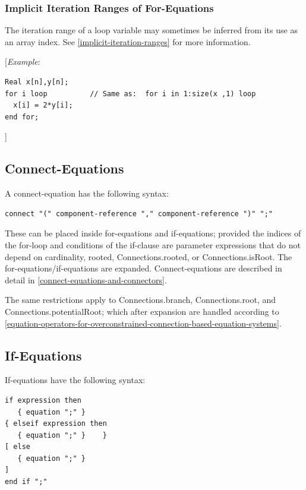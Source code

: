 \documentclass[10pt,a4paper]{report}
\def\doublelabel#1{\label{#1}}
\begin{document}
\subsubsection{Implicit Iteration Ranges of For-Equations}\doublelabel{implicit-iteration-ranges-of-for-equations}

The iteration range of a loop variable may sometimes be inferred from
its use as an array index. See \ref{implicit-iteration-ranges} for more information.

{[}\emph{Example}:
\begin{lstlisting}[language=modelica]
  Real x[n],y[n]; 
for i loop          // Same as:  for i in 1:size(x ,1) loop    
  x[i] = 2*y[i]; 
end for;
\end{lstlisting}
{]}

\subsection{Connect-Equations}\doublelabel{connect-equations}

A connect-equation has the following syntax:
\begin{lstlisting}[language=grammar]
connect "(" component-reference "," component-reference ")" ";"
\end{lstlisting}

These can be placed inside for-equations and if-equations; provided the
indices of the for-loop and conditions of the if-clause are parameter
expressions that do not depend on cardinality, rooted,
Connections.rooted, or Connections.isRoot. The
for-equations/if-equations are expanded. Connect-equations are described
in detail in \ref{connect-equations-and-connectors}.

The same restrictions apply to Connections\allowbreak{}.branch, Connections\allowbreak{}.root, and
Connections\allowbreak{}.potentialRoot; which after expansion are handled according
to \ref{equation-operators-for-overconstrained-connection-based-equation-systems}.

\subsection{If-Equations}\doublelabel{if-equations}

If-equations have the following syntax:
\begin{lstlisting}[language=grammar]
if expression then      
   { equation ";" }    
{ elseif expression then      
   { equation ";" }    }    
[ else      
   { equation ";" }    
]
end if ";" 
\end{lstlisting}
\end{document}
